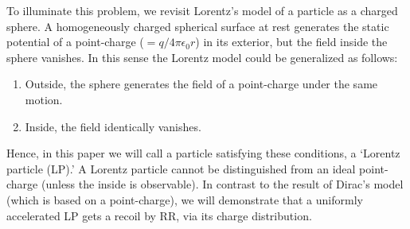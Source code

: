 \documentclass[a4paper,fleqn]{cas-sc}
\begin{document}
To illuminate this problem, we revisit Lorentz's model of a particle as a charged sphere. A homogeneously charged spherical surface at rest generates the static potential of a point-charge ($=q/4\pi\epsilon_{0}r$) in its exterior, but the field inside the sphere vanishes. In this sense the Lorentz model could be generalized as follows:
\begin{enumerate}
\item
Outside, the sphere generates the field of a point-charge under the same motion.
\item
Inside, the field identically vanishes.
\end{enumerate}
Hence, in this paper we will call a particle satisfying these conditions, a `Lorentz particle (LP).' A Lorentz particle cannot be distinguished from an ideal point-charge (unless the inside is observable). In contrast to the result of Dirac's model (which is based on a point-charge), we will demonstrate that a uniformly accelerated LP gets a recoil by RR, via its charge distribution.
\end{document}
